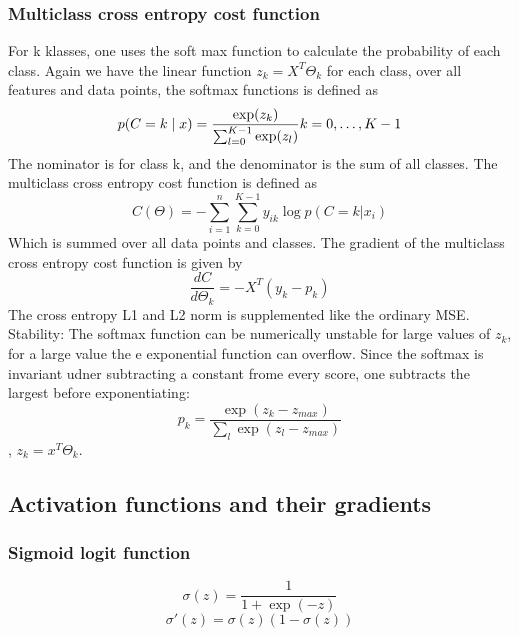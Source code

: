 \subsubsection{Multiclass cross entropy cost function}
For k klasses, one uses the soft max function to calculate the probability of each class.
Again we have the linear function $z_k = X^T\Theta_k$ for each class, over all features and data points, 
the softmax functions is defined as
\begin{equation}
    p(C = k \mid x) = \frac{\exp(z_k)}
                 {\sum_{l=0}^{K-1}\exp(z_l)} \\
        k = 0, \ldots, K-1
    \label{eq:SoftmaxFunc}
\end{equation}
The nominator is for class k, and the denominator is the sum of all classes.
The multiclass cross entropy cost function is defined as
\begin{equation}
    C(\Theta) = -\sum_{i=1}^{n}\sum_{k=0}^{K-1}y_{ik}\log p(C=k|x_i)
    \label{eq: SoftmaxCost}
\end{equation}
Which is summed over all data points and classes.
The gradient of the multiclass cross entropy cost function is given by
\begin{equation}
    \frac{dC}{d\Theta_k} = -X^T(y_k - p_k)
    \label{eq: SoftmaxCostGradient}
\end{equation}
The cross entropy L1 and L2 norm is supplemented like the ordinary MSE.  
Stability:
The softmax function can be numerically unstable for large values of $z_k$, for a large value the e
exponential function can overflow. Since the softmax is invariant udner subtracting a constant frome
every score, one subtracts the largest before exponentiating:
$$p_k = \frac{\exp(z_k - z_{max})}{\sum_{l}\exp(z_l - z_{max})}$$, $z_k = x^T\Theta_k$. 
\cite[p.~151-156]{LectureNotes}

\subsection{Activation functions and their gradients}
\subsubsection{Sigmoid logit function}

\begin{equation}
    \sigma(z) = \frac{1}{1 + \exp(-z)}
    \label{eq:Sigmoid}
\end{equation}
\begin{equation}
    \sigma'(z) = \sigma(z)(1 - \sigma(z))
    \label{eq : SigmaPrime}
\end{equation}

